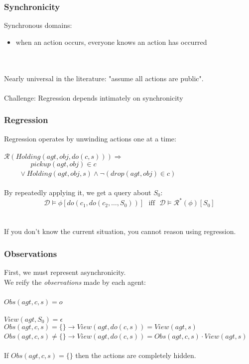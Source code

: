 \documentclass{beamer}
\newcommand{\Dt}{\mathcal{D}}
\newcommand{\Reg}{\mathcal{R}}
\begin{document}
\begin{frame}
\frametitle{Synchronicity}
Synchronous domains:
\begin{itemize}
\item when an action occurs, everyone knows an action has occurred
\end{itemize}
\ \\
\ \\
Nearly universal in the literature: "assume all actions are public".
\ \\
\ \\
\pause
\alert{Challenge:}  Regression depends intimately on synchronicity

\end{frame}

\begin{frame}
\frametitle{Regression}
Regression operates by unwinding actions one at a time:
\ \\
\ \\
$\Reg(Holding(agt,obj,do(c,s))) \Rightarrow$\\
$\,\,\,\,\,\,\,\,\,\,\,\,\,\,\,\,\,\,\,\,\,\,\,pickup(agt,obj) \in c$ \\
$\,\,\,\,\,\,\,\,\,\,\,\,\,\vee Holding(agt,obj,s) \wedge \neg\left(drop(agt,obj) \in c\right)$
\ \\
\ \\
\pause
By repeatedly applying it, we get a query about $S_0$:
\[
\Dt\models\phi[do(c_1,do(c_2,\dots,S_0))]\,\,\,\,\mathrm{iff}\,\,\,\,\Dt\models\Reg^{*}(\phi)[S_0]
\]
\ \\
\ \\
\pause
If you don't know the current situation, you cannot reason using regression.
\end{frame}

\begin{frame}
\frametitle{Observations}
First, we must represent asynchronicity.\\
We reify the \emph{observations} made by each agent:
\ \\
\ \\
\small
$Obs(agt,c,s) = o$
\ \\
\ \\
$View(agt,S_0) = \epsilon$\\
$Obs(agt,c,s) = \{\} \rightarrow View(agt,do(c,s)) = View(agt,s)$\\
$Obs(agt,c,s) \neq \{\} \rightarrow View(agt,do(c,s)) = Obs(agt,c,s) \cdot View(agt,s)$
\normalsize
\ \\
\ \\
If $Obs(agt,c,s)=\{\}$ then the actions are completely hidden.
\end{frame}
\end{document}
